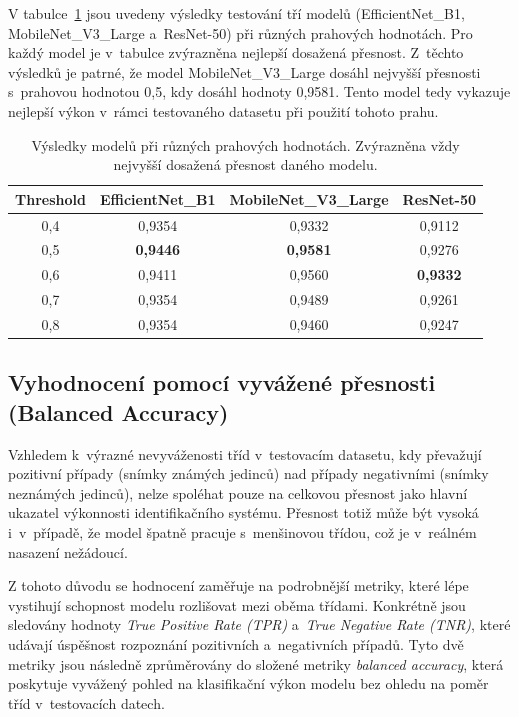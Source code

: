 V tabulce~\ref{tab:results} jsou uvedeny výsledky testování tří modelů (EfficientNet\_B1, MobileNet\_V3\_Large a~ResNet-50) při různých prahových hodnotách. Pro každý model je v~tabulce zvýrazněna nejlepší dosažená přesnost. Z~těchto výsledků je patrné, že model MobileNet\_V3\_Large dosáhl nejvyšší přesnosti s~prahovou hodnotou 0,5, kdy dosáhl hodnoty 0,9581. Tento model tedy vykazuje nejlepší výkon v~rámci testovaného datasetu při použití tohoto prahu.
\begin{table}[h!]
	\centering
	\begin{tabular}{|c|c|c|c|}
		\hline
		\textbf{Threshold} & \textbf{EfficientNet\_B1} & \textbf{MobileNet\_V3\_Large} & \textbf{ResNet-50} \\ \hline
		0,4 & 0,9354 & 0,9332 & 0,9112 \\ \hline
		0,5 & \textbf{0,9446} & \textbf{0,9581} & 0,9276 \\ \hline
		0,6 & 0,9411 & 0,9560 & \textbf{0,9332} \\ \hline
		0,7 & 0,9354 & 0,9489 & 0,9261 \\ \hline
		0,8 & 0,9354 & 0,9460 & 0,9247 \\ \hline
	\end{tabular}
	\caption{Výsledky modelů při různých prahových hodnotách. Zvýrazněna vždy nejvyšší dosažená přesnost daného modelu.}
	\label{tab:results}
\end{table}

\subsection*{Vyhodnocení pomocí vyvážené přesnosti (Balanced Accuracy)}
Vzhledem k~výrazné nevyváženosti tříd v~testovacím datasetu, kdy převažují pozitivní případy (snímky známých jedinců) nad případy negativními (snímky neznámých jedinců), nelze spoléhat pouze na celkovou přesnost jako hlavní ukazatel výkonnosti identifikačního systému. Přesnost totiž může být vysoká i~v~případě, že model špatně pracuje s~menšinovou třídou, což je v~reálném nasazení nežádoucí.

Z tohoto důvodu se hodnocení zaměřuje na podrobnější metriky, které lépe vystihují schopnost modelu rozlišovat mezi oběma třídami. Konkrétně jsou sledovány hodnoty \textit{True Positive Rate (TPR)} a~\textit{True Negative Rate (TNR)}, které udávají úspěšnost rozpoznání pozitivních a~negativních případů. Tyto dvě metriky jsou následně zprůměrovány do složené metriky \textit{balanced accuracy}, která poskytuje vyvážený pohled na klasifikační výkon modelu bez ohledu na poměr tříd v~testovacích datech.

